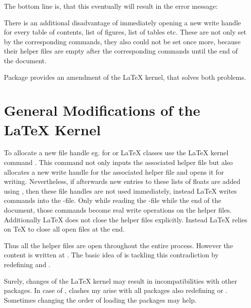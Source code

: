 The bottom line is, that this eventually will result in the error message:

There is an additional disadvantage of immediately opening a new write handle
for every table of contents, list of figures, list of tables etc.  These are
not only set by the corresponding commands, they also could not be set once
more, because their helper files are empty after the corresponding commands
until the end of the document.

Package  provides an amendment of the \LaTeX{} kernel,
that solves both problems.

\section{General Modifications of the \LaTeX{} Kernel}
\label{sec:scrwfile.kernelpatches}

To allocate a new file handle eg. for  or
 \LaTeX{} classes use the \LaTeX{} kernel command
. This command not only inputs the
associated helper file but also allocates a new write handle for the
associated helper file and opens it for writing. Nevertheless, if afterwards
new entries to these lists of floats are added using ,
then these file handles are not used immediately, instead \LaTeX{} writes
 commands into the
-file. Only while reading the -file while the end of the
document, those  commands become real write operations
on the helper files. Additionally \LaTeX{} does not close the helper files
explicitly. Instead \LaTeX{} relies on \TeX{} to close all open files at
the end.

Thus all the helper files are open throughout the entire process. However the
content is written at . The basic idea of
 is tackling this contradiction by redefining
 and .

Surely, changes of the \LaTeX{} kernel may
result in incompatibilities with other packages. In case of
, clashes my arise with all packages also redefining
 or . Sometimes changing the order of
loading the packages may help.


